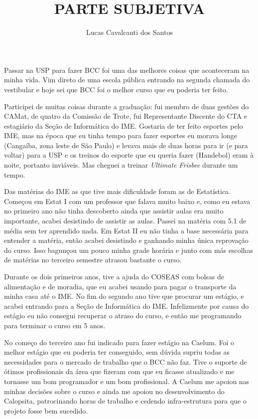 \documentclass[titlepage,a4paper]{article}
\title{PARTE SUBJETIVA}
\author{Lucas Cavalcanti dos Santos}
\newcommand{\calopsita}{Calopsita}
\begin{document}
\maketitle

Passar na USP para fazer BCC foi uma das melhores coisas que aconteceram na minha vida. Vim direto de uma escola pública entrando na segunda chamada do vestibular e hoje sei que BCC foi o melhor curso que eu poderia ter feito.

Participei de muitas coisas durante a graduação: fui membro de duas gestões do CAMat, de quatro da Comissão de Trote, fui Representante Discente do CTA e estagiário da Seção de Informática do IME. Gostaria de ter feito esportes pelo IME, mas na época que eu tinha tempo para fazer esportes eu morava longe (Cangaíba, zona leste de São Paulo) e levava mais de duas horas para ir (e para voltar) para a USP e os treinos do esporte que eu queria fazer (Handebol) eram à noite, portanto inviáveis. Mas cheguei a treinar \textit{Ultimate Frisbee} durante um tempo.

Das matérias do IME as que tive mais dificuldade foram as de Estatística. Começou em Estat I com um professor que falava muito baixo e, como eu estava no primeiro ano não tinha descoberto ainda que assistir aulas era muito importante, acabei desistindo de assistir as aulas. Passei na matéria com 5.1 de média sem ter aprendido nada. Em Estat II eu não tinha a base necessária para entender a matéria, então acabei desistindo e ganhando minha única reprovação do curso. Isso bagunçou um pouco minha grade horária e junto com más escolhas de matérias no terceiro semestre atrasou bastante o curso.

Durante os dois primeiros anos, tive a ajuda do COSEAS com bolsas de alimentação e de moradia, que eu acabei usando para pagar o transporte da minha casa até o IME. No fim do segundo ano tive que procurar um estágio, e acabei entrando para a Seção de Informática do IME. Infelizmente por causa do estágio eu não consegui recuperar o atraso do curso, e então me programando para terminar o curso em 5 anos.

No começo do terceiro ano fui indicado para fazer estágio na Caelum. Foi o melhor estágio que eu poderia ter conseguido, sem dúvida supriu todas as necessidades para o mercado de trabalho que o BCC não faz. Tive o suporte de ótimos profissionais da área que fizeram com que eu ficasse atualizado e me tornasse um bom programador e um bom profissional. A Caelum me apoiou nas minhas decisões sobre o curso e ainda me apoiou no desenvolvimento do \calopsita{}, patrocinando horas de trabalho e cedendo infra-estrutura para que o projeto fosse bem sucedido.
\end{document}
